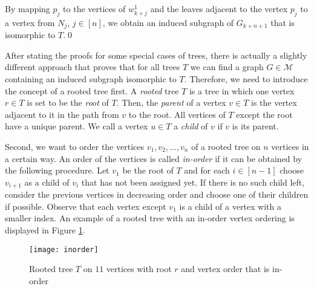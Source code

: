 \begin{prf}
By mapping $p_j$ to the vertices of $w^1_{k+j}$ and the leaves adjacent to the vertex $p_j$ to a vertex from $N_j$, $j\in [n]$, we obtain an induced subgraph of $G_{k+n+1}$ that is isomorphic to $T$.\qed
\end{prf}

After stating the proofs for some special cases of trees, there is actually a slightly different approach that proves that for all trees $T$ we can find a graph $G\in\mathcal{M}$ containing an induced subgraph isomorphic to $T$. Therefore, we need to introduce the concept of a rooted tree first. A \textit{rooted} tree $T$ is a tree in which one vertex $r\in T$ is set to be the \textit{root} of $T$. Then, the \textit{parent} of a vertex $v\in T$ is the vertex adjacent to it in the path from $v$ to the root. All vertices of $T$ except the root have a unique parent. We call a vertex $u\in T$ a \textit{child} of $v$ if $v$ is its parent.

Second, we want to order the vertices $v_1, v_2, \dots , v_n$ of a rooted tree on $n$ vertices in a certain way. An order of the vertices is called \textit{in-order} if it can be obtained by the following procedure. Let $v_1$ be the root of $T$ and for each $i\in [n-1]$ choose $v_{i+1}$ as a child of $v_i$ that has not been assigned yet. If there is no such child left, consider the previous vertices in decreasing order and choose one of their children if possible. Observe that each vertex except $v_1$ is a child of a vertex with a smaller index. An example of a rooted tree with an in-order vertex ordering is displayed in Figure \ref{f4my}.\\


\begin{figure}[ht]
\begin{center}
\texttt{[image: inorder]}
\end{center}
\caption{Rooted tree $T$ on $11$ vertices with root $r$ and vertex order that is in-order}
\label{f4my}
\end{figure}


